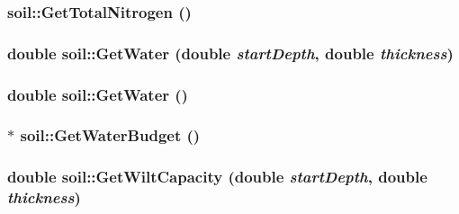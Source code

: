 \label{classsoil_ae8d39d1c2f75f1aee237f657f7ac736d}
\hypertarget{classsoil_a9bea1a88a9531db940078010517f596a}{
\subsubsection[{GetTotalNitrogen}]{ soil::GetTotalNitrogen ()}}
\label{classsoil_a9bea1a88a9531db940078010517f596a}
\hypertarget{classsoil_a52d6ffa254fce1398d47c427d572efe1}{
\subsubsection[{GetWater}]{\setlength{\rightskip}{0pt plus 5cm}double soil::GetWater (double {\em startDepth}, \/  double {\em thickness})}}
\label{classsoil_a52d6ffa254fce1398d47c427d572efe1}
\hypertarget{classsoil_ae41f4677e15e604b208276eceb2e2369}{
\subsubsection[{GetWater}]{\setlength{\rightskip}{0pt plus 5cm}double soil::GetWater ()}}
\label{classsoil_ae41f4677e15e604b208276eceb2e2369}
\hypertarget{classsoil_abe759e9b029e5e09683bd2abb8678f36}{
\subsubsection[{GetWaterBudget}]{$\ast$ soil::GetWaterBudget ()}}
\label{classsoil_abe759e9b029e5e09683bd2abb8678f36}
\hypertarget{classsoil_a06c73f2cfdba2d776e2ac58ba8894c0b}{
\subsubsection[{GetWiltCapacity}]{\setlength{\rightskip}{0pt plus 5cm}double soil::GetWiltCapacity (double {\em startDepth}, \/  double {\em thickness})}}
